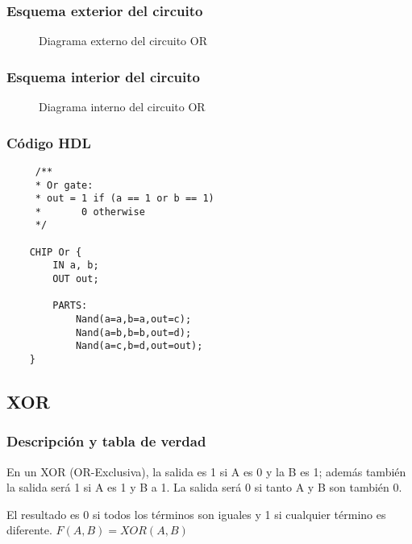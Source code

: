 \documentclass[12pt]{article}
\begin{document}
        \subsubsection{Esquema exterior del circuito}
            \begin{figure}[H]
                \centering
                
                \caption{Diagrama externo del circuito OR} \cite{diagram}
                \label{fig:enter-label}
            \end{figure}
        \subsubsection{Esquema interior del circuito}
            \begin{figure}[H]
                \centering
                
                \caption{Diagrama interno del circuito OR} \cite{diagram}
                \label{fig:enter-label}
            \end{figure}
        \newpage \subsubsection{Código HDL}  
        \begin{lstlisting}
     /**
     * Or gate:
     * out = 1 if (a == 1 or b == 1)
     *       0 otherwise
     */
    
    CHIP Or {
        IN a, b;
        OUT out; 
        
        PARTS:
            Nand(a=a,b=a,out=c);
            Nand(a=b,b=b,out=d);
            Nand(a=c,b=d,out=out);
    }
        \end{lstlisting}
    \newpage
    \subsection{XOR}

        \subsubsection{Descripción y tabla de verdad}
            En un XOR (OR-Exclusiva), la salida es 1 si A es 0 y la B es 1; además también la salida será 1 si A es 1 y B a 1. La salida será 0 si tanto A y B son también 0.
            
            El resultado es 0 si todos los términos son iguales y 1 si cualquier término es diferente.
            $F(A,B) = XOR(A,B)$
\end{document}
